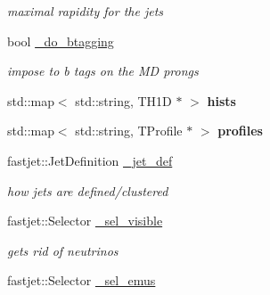 \begin{CompactItemize}
\begin{CompactList}\small\item\em maximal rapidity for the jets \item\end{CompactList}\item 
\hypertarget{classHZAnalysis_1e719e290318ecfcbee1f5e9cedd87a3}{
bool \hyperlink{classHZAnalysis_1e719e290318ecfcbee1f5e9cedd87a3}{\_\-do\_\-btagging}}
\label{classHZAnalysis_1e719e290318ecfcbee1f5e9cedd87a3}

\begin{CompactList}\small\item\em impose to b tags on the MD prongs \item\end{CompactList}\item 
\hypertarget{classHZAnalysis_3a159f663566b4fac96506240e3c88eb}{
std::map$<$ std::string, TH1D $\ast$ $>$ \textbf{hists}}
\label{classHZAnalysis_3a159f663566b4fac96506240e3c88eb}

\item 
\hypertarget{classHZAnalysis_1f01855bee3746ae1774aa5f46232fe7}{
std::map$<$ std::string, TProfile $\ast$ $>$ \textbf{profiles}}
\label{classHZAnalysis_1f01855bee3746ae1774aa5f46232fe7}

\item 
\hypertarget{classHZAnalysis_e8ade1d6521e254f510c3ffb27b7c679}{
fastjet::Jet\-Definition \hyperlink{classHZAnalysis_e8ade1d6521e254f510c3ffb27b7c679}{\_\-jet\_\-def}}
\label{classHZAnalysis_e8ade1d6521e254f510c3ffb27b7c679}

\begin{CompactList}\small\item\em how jets are defined/clustered \item\end{CompactList}\item 
\hypertarget{classHZAnalysis_213e202bcaf9849c3f5f85057be41c3d}{
fastjet::Selector \hyperlink{classHZAnalysis_213e202bcaf9849c3f5f85057be41c3d}{\_\-sel\_\-visible}}
\label{classHZAnalysis_213e202bcaf9849c3f5f85057be41c3d}

\begin{CompactList}\small\item\em gets rid of neutrinos \item\end{CompactList}\item 
\hypertarget{classHZAnalysis_bf6baa6be25cb9a33b12196d628b90f4}{
fastjet::Selector \hyperlink{classHZAnalysis_bf6baa6be25cb9a33b12196d628b90f4}{\_\-sel\_\-emus}}
\label{classHZAnalysis_bf6baa6be25cb9a33b12196d628b90f4}


\end{CompactItemize}
